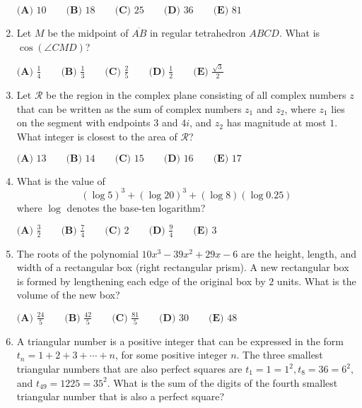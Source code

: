\documentclass{article}
\begin{document}
\begin{enumerate}[label=\arabic*., itemsep=0.5em]
\(\textbf{(A) } 10 \qquad \textbf{(B) } 18 \qquad \textbf{(C) } 25 \qquad \textbf{(D) } 36 \qquad \textbf{(E) } 81\)\par \vspace{0.5em}\item Let \(M\) be the midpoint of \(\overline{AB}\) in regular tetrahedron \(ABCD\). What is \(\cos(\angle CMD)\)?

\(\textbf{(A) } \frac14 \qquad \textbf{(B) } \frac13 \qquad \textbf{(C) } \frac25 \qquad \textbf{(D) } \frac12 \qquad \textbf{(E) } \frac{\sqrt{3}}{2}\)\par \vspace{0.5em}\item Let \(\mathcal{R}\) be the region in the complex plane consisting of all complex numbers \(z\) that can be written as the sum of complex numbers \(z_1\) and \(z_2\), where \(z_1\) lies on the segment with endpoints \(3\) and \(4i\), and \(z_2\) has magnitude at most \(1\). What integer is closest to the area of \(\mathcal{R}\)?  

\(\textbf{(A) } 13 \qquad \textbf{(B) } 14 \qquad \textbf{(C) } 15 \qquad \textbf{(D) } 16 \qquad \textbf{(E) } 17\)\par \vspace{0.5em}\item What is the value of 
\begin{equation*}
(\log 5)^3+(\log 20)^3+(\log 8)(\log 0.25)
\end{equation*}
 where \(\log\) denotes the base-ten logarithm?

\(\textbf{(A) } \frac{3}{2} \qquad \textbf{(B) } \frac{7}{4} \qquad \textbf{(C) } 2 \qquad \textbf{(D) } \frac{9}{4} \qquad \textbf{(E) } 3\)\par \vspace{0.5em}\item The roots of the polynomial \(10x^3-39x^2+29x-6\) are the height, length, and width of a rectangular box (right rectangular prism). A new rectangular box is formed by lengthening each edge of the original box by \(2\) units. What is the volume of the new box?

\(\textbf{(A) } \frac{24}{5} \qquad \textbf{(B) } \frac{42}{5} \qquad \textbf{(C) } \frac{81}{5} \qquad \textbf{(D) } 30 \qquad \textbf{(E) } 48\)\par \vspace{0.5em}\item A triangular number is a positive integer that can be expressed in the form \(t_n=1+2+3+\cdots+n\), for some positive integer \(n\). The three smallest triangular numbers that are also perfect squares are \(t_1=1=1^2, t_8=36=6^2,\) and \(t_{49}=1225=35^2\). What is the sum of the digits of the fourth smallest triangular number that is also a perfect square?


\end{enumerate}
\end{document}
